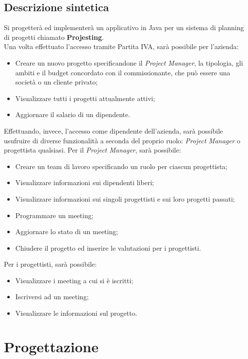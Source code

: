 \documentclass[a4paper,11pt]{report}
\begin{document}
		\section{Descrizione sintetica}
			Si progetterà ed implementerà un applicativo in Java  
			per un sistema di planning di progetti chiamato \textbf{Projesting}.\\
			Una volta effettuato l'accesso tramite Partita IVA, sarà possibile per l'azienda:
			\begin{itemize} 
				\item Creare un nuovo progetto specificandone il \textit{Project Manager}, la tipologia, gli ambiti e il budget concordato con il commissionante, che 
				può essere una società o un cliente privato;
				\item Visualizzare tutti i progetti attualmente attivi;
				\item Aggiornare il salario di un dipendente.
			\end{itemize}
			Effettuando, invece, l'accesso come dipendente dell'azienda, sarà possibile usufruire di diverse funzionalità
			a seconda del proprio ruolo: \textit{Project Manager} o progettista qualsiasi.
			Per il \textit{Project Manager}, sarà possibile:
			\begin{itemize}
				\item Creare un team di lavoro specificando un ruolo per ciascun progettista;
				\item Visualizzare informazioni sui dipendenti liberi;
				\item Visualizzare informazioni sui singoli progettisti e sui loro progetti passati;
				\item Programmare un meeting;
				\item Aggiornare lo stato di un meeting;
				\item Chiudere il progetto ed inserire le valutazioni per i progettisti.
			\end{itemize} 
			\newpage
			Per i progettisti, sarà possibile:
			\begin{itemize}
				\item Visualizzare i meeting a cui si è iscritti;
				\item Iscriversi ad un meeting;
				\item Visualizzare le informazioni sul progetto.
			\end {itemize}
	\chapter{Progettazione}
\end{document}
